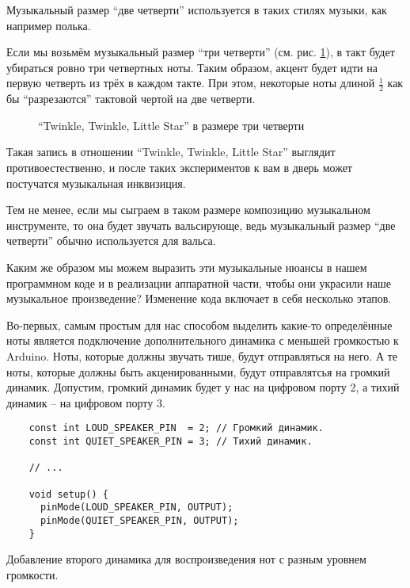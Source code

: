 \documentclass[../sparc.tex]{subfiles}
\begin{document}
Музыкальный размер ``две четверти'' используется в таких стилях музыки, как
например полька.

Если мы возьмём музыкальный размер ``три четверти''
(см. рис. \ref{fig:lilypond-musical-scale-example-4}), в такт будет убираться
ровно три четвертных ноты.  Таким образом, акцент будет идти на первую четверть
из трёх в каждом такте.  При этом, некоторые ноты длиной $\frac{1}{2}$ как бы
``разрезаются'' тактовой чертой на две четверти.

\begin{figure}[h]
  \centering
  \caption{``Twinkle, Twinkle, Little Star'' в размере три четверти}
  \label{fig:lilypond-musical-scale-example-4}
\end{figure}

Такая запись в отношении ``Twinkle, Twinkle, Little Star'' выглядит
противоестественно, и после таких экспериментов к вам в дверь может постучатся
музыкальная инквизиция.

Тем не менее, если мы сыграем в таком размере композицию музыкальном
инструменте, то она будет звучать вальсирующе, ведь музыкальный размер ``две
четверти'' обычно используется для вальса.

Каким же образом мы можем выразить эти музыкальные нюансы в нашем программном
коде и в реализации аппаратной части, чтобы они украсили наше музыкальное
произведение?  Изменение кода включает в себя несколько этапов.

Во-первых, самым простым для нас способом выделить какие-то определённые ноты
является подключение дополнительного динамика с меньшей громкостью к Arduino.
Ноты, которые должны звучать тише, будут отправляться на него.  А те ноты,
которые должны быть акценированными, будут отправлятсья на громкий динамик.
Допустим, громкий динамик будет у нас на цифровом порту 2, а тихий динамик -- на
цифровом порту 3.

\begin{listing}[ht]
  \begin{verbatim}
    const int LOUD_SPEAKER_PIN  = 2; // Громкий динамик.
    const int QUIET_SPEAKER_PIN = 3; // Тихий динамик.

    // ...

    void setup() {
      pinMode(LOUD_SPEAKER_PIN, OUTPUT);
      pinMode(QUIET_SPEAKER_PIN, OUTPUT);
    }
  \end{verbatim}
  \label{listing:adding-additional-speaker}
  \caption{Добавление второго динамика для воспроизведения нот с разным уровнем
    громкости.}
\end{listing}
\end{document}
